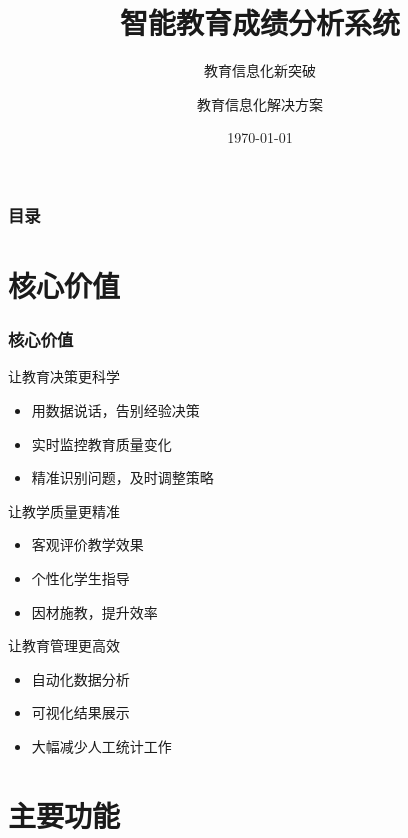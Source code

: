 \documentclass[aspectratio=169]{beamer}
\title{智能教育成绩分析系统}
\subtitle{教育信息化新突破}
\author{教育信息化解决方案}
\institute{基于大数据与人工智能技术}
\date{\today}
\begin{document}
\begin{frame}
    \titlepage
\end{frame}

\begin{frame}
    \frametitle{目录}
    \tableofcontents
\end{frame}

\section{核心价值}

\begin{frame}
    \frametitle{核心价值}
    \begin{block}{让教育决策更科学}
        \begin{itemize}
            \item 用数据说话，告别经验决策
            \item 实时监控教育质量变化
            \item 精准识别问题，及时调整策略
        \end{itemize}
    \end{block}
    
    \begin{block}{让教学质量更精准}
        \begin{itemize}
            \item 客观评价教学效果
            \item 个性化学生指导
            \item 因材施教，提升效率
        \end{itemize}
    \end{block}
    
    \begin{block}{让教育管理更高效}
        \begin{itemize}
            \item 自动化数据分析
            \item 可视化结果展示
            \item 大幅减少人工统计工作
        \end{itemize}
    \end{block}
\end{frame}

\section{主要功能}
\end{document}
